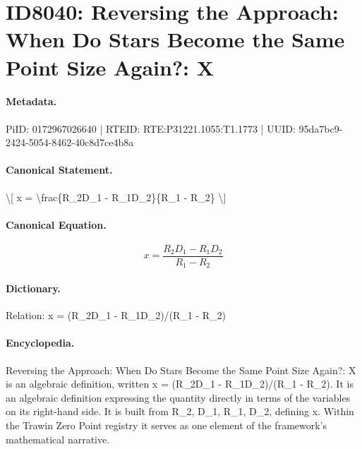 \section*{ID8040: Reversing the Approach: When Do Stars Become the Same Point Size Again?: X}
\paragraph{Metadata.}
PiID: 0172967026640 | RTEID: RTE:P31221.1055:T1.1773 | UUID: 95da7bc9-2424-5054-8462-40c8d7ce4b8a

\paragraph{Canonical Statement.}
\textbackslash{}[ x = \textbackslash{}frac\{R\_2D\_1 - R\_1D\_2\}\{R\_1 - R\_2\} \textbackslash{}]

\paragraph{Canonical Equation.}
\[
x = \frac{R_2D_1 - R_1D_2}{R_1 - R_2}
\]

\paragraph{Dictionary.}
Relation: x = (R\_2D\_1 - R\_1D\_2)/(R\_1 - R\_2)

\paragraph{Encyclopedia.}
Reversing the Approach: When Do Stars Become the Same Point Size Again?: X is an algebraic definition, written x = (R\_2D\_1 - R\_1D\_2)/(R\_1 - R\_2). It is an algebraic definition expressing the quantity directly in terms of the variables on its right-hand side. It is built from R\_2, D\_1, R\_1, D\_2, defining x. Within the Trawin Zero Point registry it serves as one element of the framework's mathematical narrative.

